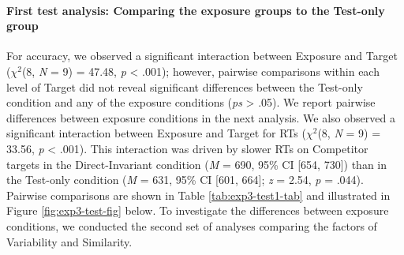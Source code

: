 \documentclass[
  12pt,
  twoside]{article}
\begin{document}
\hypertarget{first-test-analysis-comparing-the-exposure-groups-to-the-test-only-group}{%
\paragraph{First test analysis: Comparing the exposure groups to the Test-only group}\label{first-test-analysis-comparing-the-exposure-groups-to-the-test-only-group}}

For accuracy, we observed a significant interaction between Exposure and Target (\(\chi^2\)(8, \emph{N} = 9) = 47.48, \emph{p} \textless{} .001); however, pairwise comparisons within each level of Target did not reveal significant differences between the Test-only condition and any of the exposure conditions (\emph{ps} \textgreater{} .05).
We report pairwise differences between exposure conditions in the next analysis.
We also observed a significant interaction between Exposure and Target for RTs (\(\chi^2\)(8, \emph{N} = 9) = 33.56, \emph{p} \textless{} .001).
This interaction was driven by slower RTs on Competitor targets in the Direct-Invariant condition (\emph{M} = 690, 95\% CI {[}654, 730{]}) than in the Test-only condition (\emph{M} = 631, 95\% CI {[}601, 664{]}; \emph{z} = 2.54, \emph{p} = .044).
Pairwise comparisons are shown in Table \ref{tab:exp3-test1-tab} and illustrated in Figure \ref{fig:exp3-test-fig} below.
To investigate the differences between exposure conditions, we conducted the second set of analyses comparing the factors of Variability and Similarity.
\end{document}
